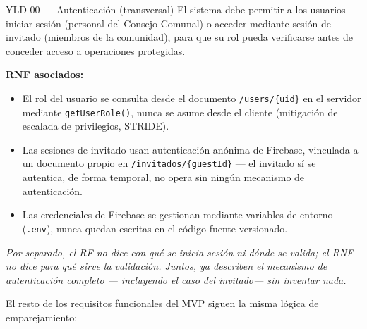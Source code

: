 \documentclass[14pt,a4paper,oneside]{extbook}
\begin{document}
\begin{specunit}{YLD-00 — Autenticación (transversal)}
El sistema debe permitir a los usuarios iniciar sesión (personal del Consejo Comunal) o acceder
mediante sesión de invitado (miembros de la comunidad), para que su rol pueda verificarse antes de
conceder acceso a operaciones protegidas.

\medskip
\textbf{RNF asociados:}
\begin{itemize}
\item El rol del usuario se consulta desde el documento \texttt{/users/\{uid\}} en el servidor
mediante \texttt{getUserRole()}, nunca se asume desde el cliente (mitigación de escalada de
privilegios, STRIDE).
\item Las sesiones de invitado usan autenticación anónima de Firebase, vinculada a un documento
propio en \texttt{/invitados/\{guestId\}} — el invitado sí se autentica, de forma temporal, no
opera sin ningún mecanismo de autenticación.
\item Las credenciales de Firebase se gestionan mediante variables de entorno (\texttt{.env}),
nunca quedan escritas en el código fuente versionado.
\end{itemize}

\medskip
\textit{Por separado, el RF no dice con qué se inicia sesión ni dónde se valida; el RNF no dice
para qué sirve la validación. Juntos, ya describen el mecanismo de autenticación completo —
incluyendo el caso del invitado— sin inventar nada.}
\end{specunit}

El resto de los requisitos funcionales del MVP siguen la misma lógica de emparejamiento:
\end{document}
